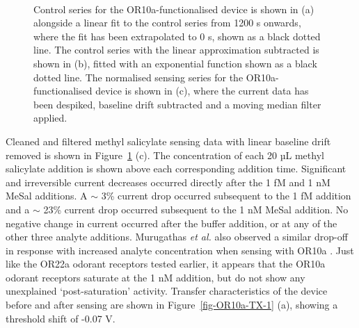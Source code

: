 \documentclass[
  a4paper,
]{scrbook}
\begin{document}
\begin{figure}
\begin{minipage}[t]{0.70\linewidth}
{{}

}

\end{minipage}%
%
\begin{minipage}[t]{0.15\linewidth}

{\centering 

~

}

\end{minipage}%

\caption{\label{fig-OR10a-sensing}Control series for the
OR10a-functionalised device is shown in (a) alongside a linear fit to
the control series from 1200 s onwards, where the fit has been
extrapolated to 0 s, shown as a black dotted line. The control series
with the linear approximation subtracted is shown in (b), fitted with an
exponential function shown as a black dotted line. The normalised
sensing series for the OR10a-functionalised device is shown in (c),
where the current data has been despiked, baseline drift subtracted and
a moving median filter applied.}

\end{figure}

Cleaned and filtered methyl salicylate sensing data with linear baseline
drift removed is shown in Figure~\ref{fig-OR10a-sensing} (c). The
concentration of each 20 µL methyl salicylate addition is shown above
each corresponding addition time. Significant and irreversible current
decreases occurred directly after the 1 fM and 1 nM MeSal additions. A
\(\sim\) 3\% current drop occurred subsequent to the 1 fM addition and a
\(\sim\) 23\% current drop occurred subsequent to the 1 nM MeSal
addition. No negative change in current occurred after the buffer
addition, or at any of the other three analyte additions. Murugathas
\emph{et al.} also observed a similar drop-off in response with
increased analyte concentration when sensing with OR10a
\autocite{Murugathas2019a}. Just like the OR22a odorant receptors tested
earlier, it appears that the OR10a odorant receptors saturate at the 1
nM addition, but do not show any unexplained `post-saturation' activity.
Transfer characteristics of the device before and after sensing are
shown in Figure~\ref{fig-OR10a-TX-1} (a), showing a threshold shift of
-0.07 V.
\end{document}
